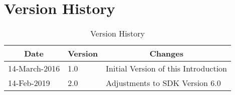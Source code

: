 \newpage
\thispagestyle{plain}
\section*{Version History}
\begin{table}[H]
\centering
	\begin{tabular}{| p{3cm} | p{2cm} | p{10cm} |}
	\multicolumn{1}{c}{\textbf{Date}} & \multicolumn{1}{c}{\textbf{Version}} & \multicolumn{1}{c}{\textbf{Changes}}\\
	\hline
	14-March-2016 & 1.0 & Initial Version of this Introduction \\
	\hline
	14-Feb-2019 & 2.0 & Adjustments to SDK Version 6.0 \\
	\hline
	\end{tabular}
	\caption{Version History}
	\label{tab:version history}
\end{table}
\clearpage


\thispagestyle{plain}
\tableofcontents

